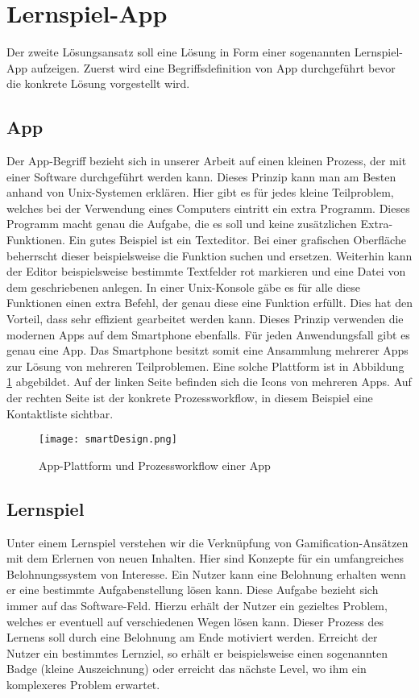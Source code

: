 \section{Lernspiel-App}
Der zweite Lösungsansatz soll eine Lösung in Form einer sogenannten Lernspiel-App aufzeigen. Zuerst wird eine Begriffsdefinition von App durchgeführt bevor die konkrete Lösung vorgestellt wird.

\subsection{App}
Der App-Begriff bezieht sich in unserer Arbeit auf einen kleinen Prozess, der mit einer Software durchgeführt werden kann. Dieses Prinzip kann man am Besten anhand von Unix-Systemen erklären. Hier gibt es für jedes kleine Teilproblem, welches bei der Verwendung eines Computers eintritt ein extra Programm. Dieses Programm macht genau die Aufgabe, die es soll und keine zusätzlichen Extra-Funktionen. Ein gutes Beispiel ist ein Texteditor. Bei einer grafischen Oberfläche beherrscht dieser beispielsweise die Funktion suchen und ersetzen. Weiterhin kann der Editor beispielsweise bestimmte Textfelder rot markieren und eine Datei von dem geschriebenen anlegen. In einer Unix-Konsole gäbe es für alle diese Funktionen einen extra Befehl, der genau diese eine Funktion erfüllt. Dies hat den Vorteil, dass sehr effizient gearbeitet werden kann. Dieses Prinzip verwenden die modernen Apps auf dem Smartphone ebenfalls. Für jeden Anwendungsfall gibt es genau eine App. Das Smartphone besitzt somit eine Ansammlung mehrerer Apps zur Lösung von mehreren Teilproblemen. Eine solche Plattform ist in Abbildung \ref{img1:smartDesign} abgebildet. Auf der linken Seite befinden sich die Icons von mehreren Apps. Auf der rechten Seite ist der konkrete Prozessworkflow, in diesem Beispiel eine Kontaktliste sichtbar. 

\begin{figure}[ht]
\begin{center}
\texttt{[image: smartDesign.png]}
\caption{App-Plattform und Prozessworkflow einer App}
\label{img1:smartDesign}
\end{center}
\end{figure} 

\subsection{Lernspiel}
Unter einem Lernspiel verstehen wir die Verknüpfung von Gamification-Ansätzen mit dem Erlernen von neuen Inhalten. Hier sind Konzepte für ein umfangreiches Belohnungssystem von Interesse. Ein Nutzer kann eine Belohnung erhalten wenn er eine bestimmte Aufgabenstellung lösen kann. Diese Aufgabe bezieht sich immer auf das Software-Feld. Hierzu erhält der Nutzer ein gezieltes Problem, welches er eventuell auf verschiedenen Wegen lösen kann. Dieser Prozess des Lernens soll durch eine Belohnung am Ende motiviert werden. Erreicht der Nutzer ein bestimmtes Lernziel, so erhält er beispielsweise einen sogenannten Badge (kleine Auszeichnung) oder erreicht das nächste Level, wo ihm ein komplexeres Problem erwartet. 

